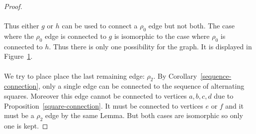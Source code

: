 \begin{proof}
\paragraph{}
Thus either $g$ or $h$ can be used to connect a $\rho_0$ edge but not both. The case where the $\rho_0$ edge is connected to $g$ is isomorphic to the case where $\rho_0$ is connected to $h$. Thus there is only one possibility for the graph. It is displayed in Figure~\ref{proof-5-4}.

\begin{figure}[H]
  \begin{center}
    \caption{}
    \label{proof-5-4}
  \end{center}
\end{figure}

\paragraph{}
We try to place place the last remaining edge: $\rho_2$. By Corollary~\ref{sequence-connection}, only a single edge can be connected to the sequence of alternating squares. Moreover this edge cannot be connected to vertices $a,b,c,d$ due to Proposition~\ref{square-connection}. It must be connected to vertices $e$ or $f$ and it must be a $\rho_2$ edge by the same Lemma. But both cases are isomorphic so only one is kept.


\end{proof}
